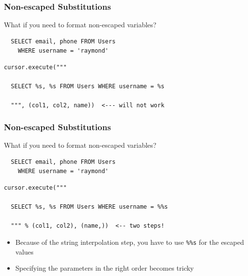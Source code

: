 \documentclass{beamer}
\begin{document}
\begin{frame}[fragile]
  \frametitle{Non-escaped Substitutions}

  What if you need to format non-escaped variables?

\begin{verbatim}
  SELECT email, phone FROM Users 
    WHERE username = 'raymond'
\end{verbatim}

\begin{verbatim}
cursor.execute("""

  SELECT %s, %s FROM Users WHERE username = %s

  """, (col1, col2, name))  <--- will not work
\end{verbatim}


\vspace{1.5cm}

\end{frame}


\begin{frame}[fragile]
  \frametitle{Non-escaped Substitutions}

  What if you need to format non-escaped variables?

\begin{verbatim}
  SELECT email, phone FROM Users 
    WHERE username = 'raymond'
\end{verbatim}

\begin{verbatim}
cursor.execute("""

  SELECT %s, %s FROM Users WHERE username = %%s

  """ % (col1, col2), (name,))  <-- two steps!
\end{verbatim}

\begin{itemize}
\item Because of the string interpolation step, you have to use \verb=%%s= for
  the escaped values
\item Specifying the parameters in the right order becomes tricky
\end{itemize}

\end{frame}
\end{document}
